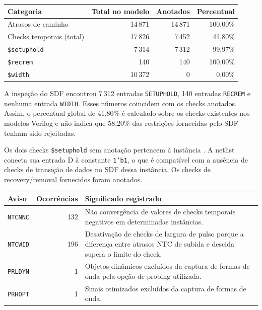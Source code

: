 \documentclass[11pt,a4paper]{article}
\begin{document}
\begin{center}
\begin{tabular}{@{}lrrr@{}}
\toprule
Categoria & Total no modelo & Anotados & Percentual \\
\midrule
Atrasos de caminho & 14\,871 & 14\,871 & 100,00\% \\
Checks temporais (total) & 17\,826 & 7\,452 & 41,80\% \\
\quad\texttt{\$setuphold} & 7\,314 & 7\,312 & 99,97\% \\
\quad\texttt{\$recrem} & 140 & 140 & 100,00\% \\
\quad\texttt{\$width} & 10\,372 & 0 & 0,00\% \\
\bottomrule
\end{tabular}
\end{center}

A inspeção do SDF encontrou 7\,312 entradas \texttt{SETUPHOLD}, 140
entradas \texttt{RECREM} e nenhuma entrada \texttt{WIDTH}. Esses números
coincidem com os checks anotados. Assim, o percentual global de 41,80\%
é calculado sobre os checks existentes nos modelos Verilog e não indica
que 58,20\% das restrições fornecidas pelo SDF tenham sido rejeitadas.

Os dois checks \texttt{\$setuphold} sem anotação pertencem à instância
.
A netlist conecta sua entrada D à constante \texttt{1'b1}, o que é
compatível com a ausência de checks de transição de dados no SDF dessa
instância. Os checks de recovery/removal fornecidos foram anotados.

\begin{center}
\begin{tabularx}{\linewidth}{@{}lrX@{}}
\toprule
Aviso & Ocorrências & Significado registrado \\
\midrule
\texttt{NTCNNC} & 132 & Não convergência de valores de checks temporais negativos em determinadas instâncias. \\
\texttt{NTCWID} & 196 & Desativação de checks de largura de pulso porque a diferença entre atrasos NTC de subida e descida supera o limite do check. \\
\texttt{PRLDYN} & 1 & Objetos dinâmicos excluídos da captura de formas de onda pela opção de probing utilizada. \\
\texttt{PRHOPT} & 1 & Sinais otimizados excluídos da captura de formas de onda. \\
\bottomrule
\end{tabularx}
\end{center}
\end{document}
